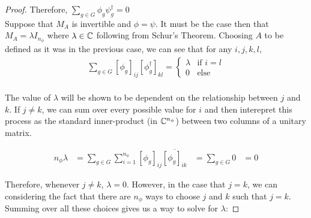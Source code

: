 \begin{proof}
Therefore, $\sum_{g\in G}\phi_{g}\psi_g^{\dag}=0$ \\

Suppose that $M_A$ is invertible and $\phi=\psi$. It must be the case then that $M_A = \lambda I_{n_\phi}$ where $\lambda \in \mathbb{C}$ following from Schur's Theorem. Choosing $A$ to be defined as it was in the previous case, we can see that for any $i,j,k,l,$
\begin{equation}
	\begin{aligned}
		\sum_{g\in G} \left[\phi_g\right]_{ij}\left[\phi^\dag_g\right]_{kl} = \begin{cases}
																			\lambda &\text{if } i = l\\
																			0 & \text{else}
																			\end{cases}\\
	\end{aligned}
\end{equation}

The value of $\lambda$ will be shown to be dependent on the relationship between $j$ and $k$. If $j\neq k$, we can sum over every possible value for $i$ and then interepret this process as the standard inner-product (in $\mathbb{C}^{n_\phi}$) between two columns of a unitary matrix.

\begin{equation}
	\begin{aligned}
		n_\phi \lambda &= \sum_{g\in G} \sum_{i=1}^{n_\phi}\left[\phi_g\right]_{ij}\overline{\left[\phi_g\right]_{ik}} &= \sum_{g\in G} 0 &= 0
	\end{aligned}
\end{equation}


Therefore, whenever $j\neq k$, $\lambda = 0$. However, in the case that $j=k$, we can considering the fact that there are $n_\phi$ ways to choose $j$ and $k$ such that $j=k$. Summing over all these choices gives us a way to solve for $\lambda$:


\end{proof}
